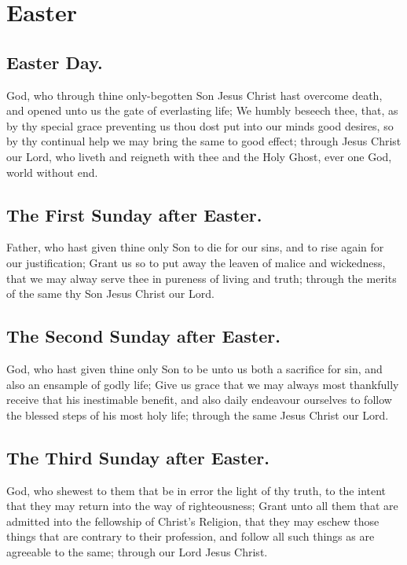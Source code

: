 \section{Easter}

\subsection{Easter Day.}
 God, who through thine only-begotten Son Jesus Christ hast overcome death, and opened unto us the gate of everlasting life; We humbly beseech thee, that, as by thy special grace preventing us thou dost put into our minds good desires, so by thy continual help we may bring the same to good effect; through Jesus Christ our Lord, who liveth and reigneth with thee and the Holy Ghost, ever one God, world without end.

\subsection{The First Sunday after Easter.}
 Father, who hast given thine only Son to die for our sins, and to rise again for our justification; Grant us so to put away the leaven of malice and wickedness, that we may alway serve thee in pureness of living and truth; through the merits of the same thy Son Jesus Christ our Lord.

\subsection{The Second Sunday after Easter.}
 God, who hast given thine only Son to be unto us both a sacrifice for sin, and also an ensample of godly life; Give us grace that we may always most thankfully receive that his inestimable benefit, and also daily endeavour ourselves to follow the blessed steps of his most holy life; through the same Jesus Christ our Lord.

\subsection{The Third Sunday after Easter.}
 God, who shewest to them that be in error the light of thy truth, to the intent that they may return into the way of righteousness; Grant unto all them that are admitted into the fellowship of Christ's Religion, that they may eschew those things that are contrary to their profession, and follow all such things as are agreeable to the same; through our Lord Jesus Christ.

